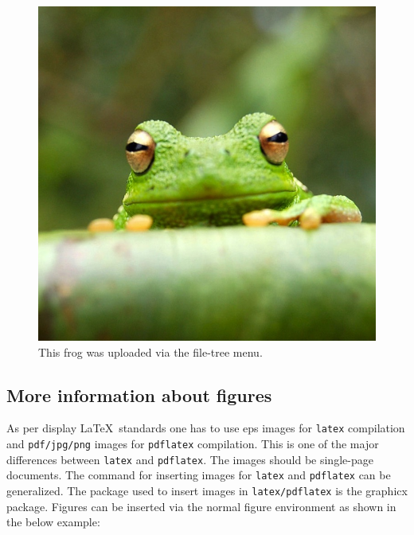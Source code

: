 \documentclass[10pt,a4paper]{article}
\begin{document}
\begin{appendices}
\begin{figure}[!ht]
\centering
\includegraphics[width=0.4\linewidth]{figures/frog.jpg}
\caption{\label{fig:frog}This frog was uploaded via the file-tree menu.}
\end{figure}

\subsection{More information about figures}

As per display \LaTeX\ standards one has to use eps images for \verb+latex+ compilation and \verb+pdf/jpg/png+ images for
\verb+pdflatex+ compilation. This is one of the major differences between \verb+latex+
and \verb+pdflatex+. The images should be single-page documents. The command for inserting images
for \verb+latex+ and \verb+pdflatex+ can be generalized. The package used to insert images in \verb+latex/pdflatex+ is the
graphicx package. Figures can be inserted via the normal figure environment as shown in the below example:



\end{appendices}
\end{document}
